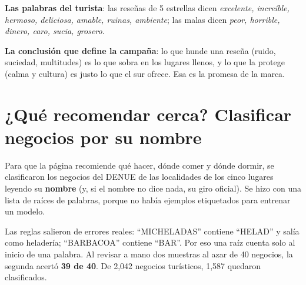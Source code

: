 \textbf{Las palabras del turista}: las reseñas de 5 estrellas dicen \emph{excelente, increíble, hermoso, deliciosa, amable,
ruinas, ambiente}; las malas dicen \emph{peor, horrible, dinero, caro, sucia, grosero}.

\textbf{La conclusión que define la campaña}: lo que hunde una reseña (ruido, suciedad, multitudes) es lo que sobra en los
lugares llenos, y lo que la protege (calma y cultura) es justo lo que el sur ofrece. Esa es la promesa de la marca.

\section{¿Qué recomendar cerca? Clasificar negocios por su nombre}
Para que la página recomiende qué hacer, dónde comer y dónde dormir, se clasificaron los negocios del DENUE de las
localidades de los cinco lugares leyendo su \textbf{nombre} (y, si el nombre no dice nada, su giro oficial). Se hizo con
una lista de raíces de palabras, porque no había ejemplos etiquetados para entrenar un modelo.

Las reglas salieron de errores reales: ``MICHELADAS'' contiene ``HELAD'' y salía como heladería; ``BARBACOA'' contiene
``BAR''. Por eso una raíz cuenta solo al inicio de una palabra. Al revisar a mano dos muestras al azar de 40 negocios, la
segunda acertó \textbf{39 de 40}. De 2,042 negocios turísticos, 1,587 quedaron clasificados.

